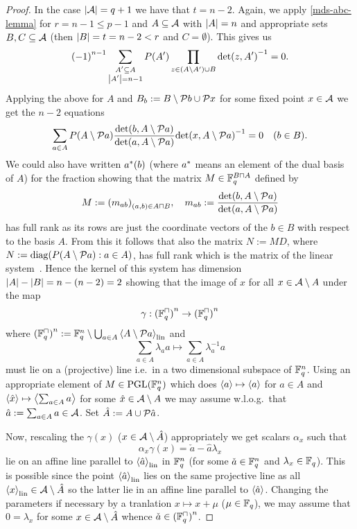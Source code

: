 \begin{proof}
    In the case $\left|\mathcal{A}\right|=q+1$ we have that $t=n-2$.
    Again, we apply \autoref{mds-abc-lemma} for $r=n-1\leq p-1$ and $A\subseteq \mathcal{A}$ with
    $\left|A\right|=n$ and appropriate sets $B,C\subseteq \mathcal{A}$ (then
    $\left|B\right|=t=n-2<r$ and $C=\emptyset$). This gives us
    $$ {(-1)}^{n-1}\sum_{\substack{A'\subseteq A \\
            \left|A'\right|=n-1}}{P(A')\prod_{z\in (A\setminus A')\cup
            B}{{\det(z,A')}^{-1}}} = 0.
    $$
    Applying the above for $A$ and $B_b:=B\setminus\set{b}\setjoin\set{x}$ for some fixed point $x\in \mathcal{A}$ we get the $n-2$ equations
    $$
    \sum_{a\in A}{P(A\setminus\set{a})\frac{\det(b,A\setminus\set{a})}{\det(a,A\setminus\set{a})}{\det(x,A\setminus\set{a})}^{-1}} = 0\quad (b\in B).\label{mds-class-n-leq-p-keysys}
    $$
    We could also have written $a^{\ast}(b)$ (where $a^{\ast}$ means an element of the dual basis of $A$) for the fraction showing that the matrix $M\in \field{q}^{B\setprod A}$ defined by
    $$
    M:={(m_{ab})}_{(a,b)\in A\setprod B},\quad
    m_{ab} := \frac{\det(b,A\setminus\set{a})}{\det(a,A\setminus\set{a})}
    $$
    has full rank as its rows are just the coordinate vectors of the $b\in B$ with respect to the basis $A$.%
    From this it follows that also the matrix $N:=MD$, where $N:=\diag(P(A\setminus\set{a}):a\in A)$, has full rank which is the matrix of the linear system~.
    Hence the kernel of this system has dimension $\left|A\right|-\left|B\right|=n-(n-2)=2$ showing that the image of $x$ for all $x\in \mathcal{A}\setminus A$ under the map
    $$
    \gamma:{(\units{\field{q}})}^n\to{(\units{\field{q}})}^n
    $$
    where ${(\units{\field{q}})}^n:=\field{q}^n\setminus\Setjoin_{a\in A}{\gen{A\setminus\set{a}}_{\lin}}$ and
    $$
    \sum_{a\in A}{\lambda_a a}\mapsto \sum_{a\in A}{\lambda_a^{-1} a}
    $$
    must lie on a (projective) line i.e.~in a two dimensional subspace of $\mathbb{F}_{q}^n$.
    Using an appropriate element of $M\in\mathrm{PGL}(\mathbb{F}_{q}^n)$ which does $\gen a \mapsto \gen a$ for $a\in A$ and $\gen{\hat x}\mapsto \gen{\sum_{a\in A}{a}}$ for some $\hat x\in \mathcal{A}\setminus A$ we may assume w.l.o.g.~that $\hat a:=\sum_{a\in A}{a}\in \mathcal{A}$. Set $\hat{A}:=A\setjoin\set{\hat a}$. 

    Now, rescaling the $\gamma(x)$ ($x\in\mathcal{A}\setminus \hat A$) appropriately we get scalars $\alpha_x$ such that
    $$
    \alpha_x\gamma(x)=\check a-\hat a\lambda_x
    $$
    lie on an affine line parallel to $\gen{\hat a}_{\lin}$ in $\mathbb{F}_{q}^n$ (for some $\check a\in\mathbb{F}_{q}^n$ and $\lambda_x\in\mathbb{F}_{q}$). This is possible since the point $\gen{\hat a}_{\lin}$ lies on the same projective line as all $\gen{x}_{\lin}\in\cA\setminus \hat A$ so the latter lie in an affine line parallel to $\gen{\hat a}$.
    Changing the parameters if necessary by a tranlation $x\mapsto x+\mu$ ($\mu\in\mathbb{F}_{q}$), we may assume that $0=\lambda_x$ for some $x\in \mathcal{A}\setminus \hat{A}$ whence $\check a\in {(\units{\field{q}})}^n$.


\end{proof}
